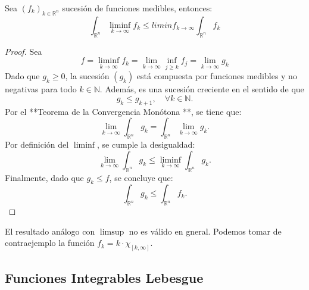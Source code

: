 \begin{lema}
    Sea $(f_k)_{k\in\mathbb{R}^n}$ sucesión de funciones medibles, entonces: $$\int_{\mathbb{R}^n}\liminf_{k\to\infty}f_k \leq liminf_{k\to\infty}\int_{\mathbb{R}^n}f_k$$
\end{lema}
\begin{proof}
    Sea $$ f = \liminf_{k \to \infty} f_k = \lim_{k \to \infty} \inf_{j \geq k} f_j = \lim_{k \to \infty} g_k $$
    Dado que $ g_k \geq 0 $, la sucesión $ (g_k) $ está compuesta por funciones medibles y no negativas para todo $ k \in \mathbb{N} $. Además, es una sucesión creciente en el sentido de que 
    $$ g_k \leq g_{k+1}, \quad \forall k \in \mathbb{N}. $$ Por el **Teorema de la Convergencia Monótona **, se tiene que:
    $$ \lim_{k \to \infty} \int_{\mathbb{R}^n} g_k = \int_{\mathbb{R}^n} \lim_{k \to \infty} g_k.$$ Por definición del $ \liminf $, se cumple la desigualdad:
    $$\lim_{k \to \infty} \int_{\mathbb{R}^n} g_k \leq \liminf_{k \to \infty} \int_{\mathbb{R}^n} g_k.$$
    Finalmente, dado que $ g_k \leq f $, se concluye que:
    $$\int_{\mathbb{R}^n} g_k \leq \int_{\mathbb{R}^n} f_k.$$
\end{proof}
\begin{observación}
    El resultado análogo con $\limsup$ no es válido en gneral. Podemos tomar de contraejemplo la función $f_k = k \cdot \chi_{[k, \infty]}$.
\end{observación}

\subsection{Funciones Integrables Lebesgue}

